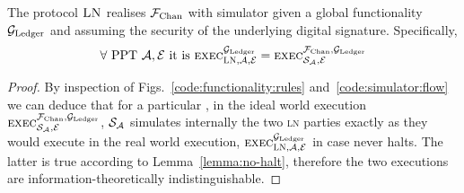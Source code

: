 \begin{theorem}
  The protocol $\textsc{LN}$ realises $\mathcal{F}_{\mathrm{Chan}}$ with simulator \simulator given a
  global functionality $\mathcal{G}_{\mathrm{Ledger}}$ and assuming the security of the underlying
  digital signature. Specifically,
  \begin{gather*}
    \forall \text{ PPT } \mathcal{A}, \mathcal{E} \text{ it is }
    \textsc{exec}^{\mathcal{G}_{\mathrm{Ledger}}}_{\textsc{LN}, \mathcal{A}, \mathcal{E}} =
    \textsc{exec}^{\mathcal{F}_{\mathrm{Chan}}, \mathcal{G}_{\mathrm{Ledger}}}_{\mathcal{S}_{\mathcal{A}}, \mathcal{E}}
  \end{gather*}
\end{theorem}

\begin{proof}
  By inspection of Figs.~\ref{code:functionality:rules}
  and~\ref{code:simulator:flow} we can deduce that for a particular
  \environment, in the ideal world execution $\textsc{exec}^{\mathcal{F}_{\mathrm{Chan}},
  \mathcal{G}_{\mathrm{Ledger}}}_{\mathcal{S}_{\mathcal{A}}, \mathcal{E}}$, $\mathcal{S}_{\mathcal{A}}$
  simulates internally the two \textsc{ln} parties exactly as they would execute
  in the real world execution, $\textsc{exec}^{\mathcal{G}_{\mathrm{Ledger}}}_{\textsc{LN},
  \mathcal{A}, \mathcal{E}}$ in case \fchan never halts. The latter is true
  according to Lemma~\ref{lemma:no-halt}, therefore the two executions are
  information-theoretically indistinguishable.
\end{proof}
